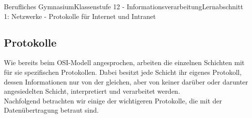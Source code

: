 \documentclass[11pt,oneside,openany,headings=optiontotoc,11pt,numbers=noenddot]{article}
\begin{document}
	\begin{worksheet}{Berufliches Gymnasium}{Klassenstufe 12 - Informationsverarbeitung}{Lernabschnitt 1: Netzwerke - Protokolle für Internet und Intranet}
		\setcounter{section}{1}
		\setcounter{subsection}{4}
		\subsection{Protokolle}
		Wie bereits beim OSI-Modell angesprochen, arbeiten die einzelnen Schichten mit für sie spezifischen Protokollen. Dabei besitzt jede Schicht ihr eigenes Protokoll, dessen Informationen nur von der gleichen, aber von keiner darüber oder darunter angesiedelten Schicht, interpretiert und verarbeitet werden.\\
		Nachfolgend betrachten wir einige der wichtigeren Protokolle, die mit der Datenübertragung betraut sind.

\end{worksheet}
\end{document}
